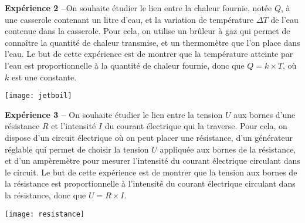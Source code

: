 \begin{activite}
\begin{partie}
{\vspace{2em}

\begin{minipage}[c]{.68\linewidth}
\textbf{Expérience 2 --}On souhaite étudier le lien entre la chaleur fournie, notée $Q$, à une casserole contenant un litre d'eau, et la variation de température $\Delta T$ de l'eau contenue dans la casserole. Pour cela, on utilise un brûleur à gaz qui permet de connaître la quantité de chaleur transmise, et un thermomètre que l'on place dans l'eau. Le but de cette expérience est de montrer que la température atteinte par l'eau est proportionnelle à la quantité de chaleur fournie, donc que $Q = k \times T$, où $k$ est une constante.
\end{minipage}\hfill%
\begin{minipage}[c]{.28\linewidth}
\centering
\texttt{[image: jetboil]}
\end{minipage}

\vspace{2em}

\begin{minipage}[c]{.68\linewidth}
\textbf{Expérience 3 --} On souhaite étudier le lien entre la tension $U$ aux bornes d'une résistance $R$  et l'intensité $I$ du courant électrique qui la traverse. Pour cela, on dispose d'un circuit électrique où on peut placer une résistance, d'un générateur réglable qui permet de choisir la tension $U$ appliquée aux bornes de la résistance, et d'un ampèremètre pour mesurer l'intensité du courant électrique circulant dans le circuit. Le but de cette expérience est de montrer que la tension aux bornes de la résistance est proportionnelle à l'intensité du courant électrique circulant dans la résistance, donc que $U = R \times I$.
\end{minipage}\hfill%
\begin{minipage}[c]{.28\linewidth}
\centering
\texttt{[image: resistance]}
\end{minipage}

}%

\end{partie}
\end{activite}

